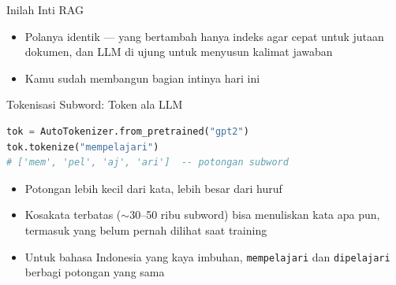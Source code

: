 \documentclass[aspectratio=169,t]{beamer}
\begin{document}
\begin{frame}{Inilah Inti RAG}
  \begin{center}
  \end{center}
  \vspace{0.7em}
  \begin{itemize}
    \footnotesize
    \item Polanya identik --- yang bertambah hanya indeks agar cepat untuk jutaan dokumen,
          dan LLM di ujung untuk menyusun kalimat jawaban
    \item Kamu sudah membangun bagian intinya hari ini
  \end{itemize}
\end{frame}

\begin{frame}[fragile]{Tokenisasi Subword: Token ala LLM}
  \begin{lstlisting}[language=Python]
tok = AutoTokenizer.from_pretrained("gpt2")
tok.tokenize("mempelajari")
# ['mem', 'pel', 'aj', 'ari']  -- potongan subword
  \end{lstlisting}
  \vspace{0.3em}
  \begin{itemize}
    \footnotesize
    \item Potongan lebih kecil dari kata, lebih besar dari huruf
    \item Kosakata terbatas ($\sim$30--50 ribu subword) bisa menuliskan kata apa pun,
          termasuk yang belum pernah dilihat saat training
    \item Untuk bahasa Indonesia yang kaya imbuhan, \texttt{mempelajari} dan
          \texttt{dipelajari} berbagi potongan yang sama
  \end{itemize}
\end{frame}
\end{document}
